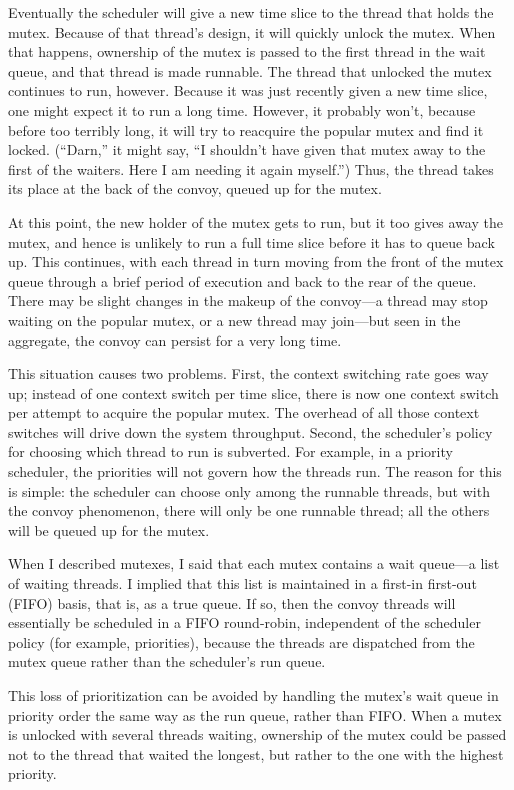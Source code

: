 Eventually the scheduler will give a new time slice to the thread that
holds the mutex.  Because of that thread's design, it will quickly
unlock the mutex.  When that happens, ownership of the mutex is passed
to the first thread in the wait queue, and that thread is made
runnable.  The thread that unlocked the mutex continues to run,
however.  Because it was just recently given a new time slice, one might
expect it to run a long time.  However, it probably won't, because
before too terribly long, it will try to reacquire the popular mutex
and find it locked.  (``Darn,'' it might say, ``I shouldn't have given
that mutex away to the first of the waiters.  Here I am needing it
again myself.'')  Thus, the thread takes its place at the back of the
convoy, queued up for the mutex.

At this point, the new holder of the mutex gets to run, but it too
gives away the mutex, and hence is unlikely to run a full time slice
before it has to queue back up.  This continues, with each thread in
turn moving from the front of the mutex queue through a brief period
of execution and back to the rear of the queue.  There may be slight
changes in the makeup of the convoy---a thread may stop waiting on the
popular mutex, or a new thread may join---but seen in the aggregate,
the convoy can persist for a very long time.

This situation causes two problems.  First, the context switching rate
goes way up; instead of one context switch per time slice, there is now
one context switch per attempt to acquire the popular mutex.  The
overhead of all those context switches will drive down the system
throughput.  Second, the scheduler's policy for choosing which thread
to run is subverted.  For example, in a priority scheduler, the
priorities will not govern how the threads run.  The reason for this
is simple: the scheduler can choose only among the runnable threads,
but with the convoy phenomenon, there will only be one runnable
thread; all the others will be queued up for the mutex.

When I described mutexes, I said that each mutex contains a wait
queue---a list
of waiting threads.  I implied that this list is maintained in a
first-in first-out (FIFO) basis, that is, as a true queue.  If so, then the
convoy threads will essentially be scheduled in a FIFO round-robin,
independent of the scheduler policy (for example, priorities), because the
threads are dispatched from the mutex queue rather than the
scheduler's run queue.

This loss of prioritization can be avoided by handling
the mutex's wait queue in priority order the same way as
the run queue, rather than FIFO.  When a mutex is
unlocked with several threads waiting, ownership of the mutex could be
passed not to the thread that waited the longest, but rather to the
one with the highest priority.

